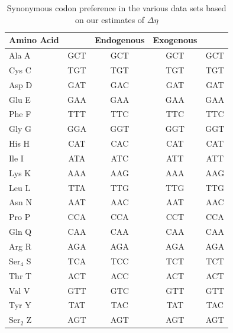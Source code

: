 \documentclass[fleqn,letterpaper]{article}
\begin{document}
\begin{table}
    \centering
    \caption{Synonymous codon preference in the various data sets based on our estimates of $\Delta \eta$}
\begin{tabular}{  l  c  c  c  c  }
\hline
	Amino Acid & \gossypii & Endogenous & Exogenous & \kluyveri \\ \hline
	Ala A & GCT & GCT & GCT & GCT \\ 
	Cys C & TGT & TGT & TGT & TGT \\ 
	Asp D & GAT & GAC & GAT & GAT \\ 
	Glu E & GAA & GAA & GAA & GAA \\ 
	Phe F & TTT & TTC & TTC & TTC \\ 
	Gly G & GGA & GGT & GGT & GGT \\ 
	His H & CAT & CAC & CAT & CAT \\ 
	Ile I & ATA & ATC & ATT & ATT \\ 
	Lys K & AAA & AAG & AAA & AAG \\ 
	Leu L & TTA & TTG & TTG & TTG \\ 
	Asn N & AAT & AAC & AAT & AAC \\ 
	Pro P & CCA & CCA & CCT & CCA \\ 
	Gln Q & CAA & CAA & CAA & CAA \\ 
	Arg R & AGA & AGA & AGA & AGA \\ 
	Ser$_4$ S & TCA & TCC & TCT & TCT \\ 
	Thr T & ACT & ACC & ACT & ACT \\ 
	Val V & GTT & GTC & GTT & GTT \\ 
	Tyr Y & TAT & TAC & TAT & TAC \\ 
	Ser$_2$ Z & AGT & AGT & AGT & AGT \\ \hline
\end{tabular}
    \label{tab:codon_pref_deta}
\end{table}
\clearpage
\end{document}
